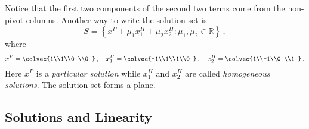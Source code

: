 \begin{example}
Notice that the first two components of the second two terms come from the non-pivot columns.
Another way to write the solution set is
\[S= \left\{  x^P  + \mu_1 x^H _1 + \mu_2 x^H _2   : \mu_1,\mu_2 \in  {\mathbb R}   \right\}\, , \]
where 
\[x^P = \colvec{1\\1\\0 \\0 }\, ,\quad x^H _1=\colvec{-1\\1\\1\\0 } \, ,\quad x^H _2= \colvec{1\\-1\\0 \\1 }\, .
\]
Here $x^P $ is a {\itshape particular solution} while $x^H _1$ and $x^H _2$ are called {\itshape homogeneous solutions}. The solution set forms a plane.
\end{example}



\subsection{Solutions and Linearity}
%

